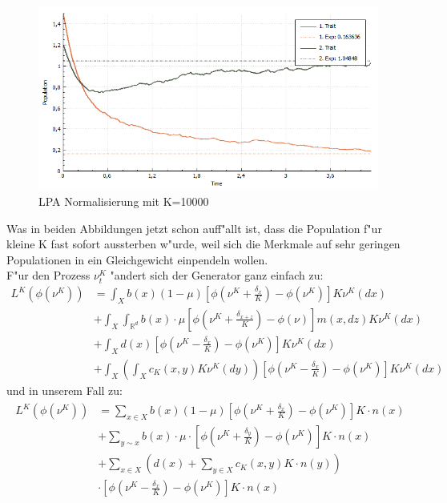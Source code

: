 \documentclass[11pt, a4paper, german]{article}
\theoremstyle{plain}
\begin{document}
	\begin{figure}[H]
		\centering
		\includegraphics[width=1\linewidth]{./Pictures/LPANormalisierungK10000}
		\caption[LPAK100]{LPA Normalisierung mit K=10000}
		\label{LPA Normalisierung K=10000}
	\end{figure}
	Was in beiden Abbildungen jetzt schon auff"allt ist, dass die Population f"ur kleine K fast sofort aussterben w"urde, weil sich die Merkmale auf sehr geringen Populationen in ein Gleichgewicht einpendeln wollen.\\
	F"ur den Prozess $ \nu_t^K $ "andert sich der Generator ganz einfach zu:
	\begin{align*}
		L^K(\phi(\nu^K)) &= \int_{X} b(x)(1-\mu)\left[\phi\left(\nu^K + \frac{\delta_x}{K}\right) - \phi(\nu^K)\right]K\nu^K(dx)\\
			  &+ \int_{X}\int_{\mathbb{R}^d} b(x) \cdot \mu \left[\phi\left(\nu^K + \frac{\delta_{x+z}}{K}\right) - \phi(\nu)\right] m(x,dz) K \nu^K(dx)\\
		  	  &+ \int_{X} d(x)\left[\phi\left(\nu^K - \frac{\delta_x}{K}\right) - \phi(\nu^K)\right]K\nu^K(dx)\\
		 	  &+ \int_{X} \left( \int_{X} c_K(x,y) K \nu^K(dy) \right) \left[\phi(\nu^K - \frac{\delta_x}{K}) - \phi(\nu^K)\right]K\nu^K(dx)
	\end{align*}
	und in unserem Fall zu:
	\begin{align}
	\begin{split}
			L^K(\phi(\nu^K)) &= \sum_{x \in X} b(x)(1-\mu)\left[\phi\left(\nu^K + \frac{\delta_x}{K}\right) - \phi(\nu^K)\right]K \cdot n(x)\\
			&+ \sum_{y \sim x}b(x) \cdot \mu \cdot 
		 \left[\phi\left(\nu^K + \frac{\delta_y}{K}\right) - \phi(\nu^K)\right]K \cdot n(x)\\		 
			&+ \sum_{x \in X} \left(d(x) + \sum_{y \in X} c_K(x,y) K \cdot n(y)\right)\\
			&\cdot \left[\phi\left(\nu^K - \frac{\delta_x}{K}\right) - \phi(\nu^K)\right]K \cdot n(x) \label{GeneratorDiskretK}
	\end{split}
	\end{align}
\end{document}
